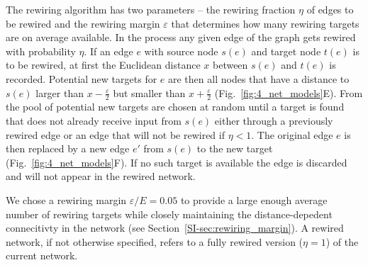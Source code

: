 The rewiring algorithm has two parameters -- the rewiring fraction
$\eta$ of edges to be rewired and the rewiring margin $\varepsilon$
that determines how many rewiring targets are on average available. In
the process any given edge of the graph gets rewired with probability
$\eta$. If an edge $e$ with source node $s(e)$ and target node $t(e)$
is to be rewired, at first the Euclidean distance $x$ between $s(e)$
and $t(e)$ is recorded. Potential new targets for $e$ are then all
nodes that have a distance to $s(e)$ larger than
$x-\frac{\varepsilon}{2}$ but smaller than $x+\frac{\varepsilon}{2}$
(Fig.~\ref{fig:4_net_models}E). From the pool of potential new targets
are chosen at random until a target is found that does not already
receive input from $s(e)$ either through a previously rewired edge or
an edge that will not be rewired if $\eta <1$. The original edge $e$
is then replaced by a new edge $e'$ from $s(e)$ to the new target
(Fig.~\ref{fig:4_net_models}F). If no such target is available the
edge is discarded and will not appear in the rewired network.

We chose a rewiring margin $\varepsilon / E = 0.05$ to provide a large
enough average number of rewiring targets while closely maintaining
the distance-depedent connecitivty in the network (see
Section~\ref{SI-sec:rewiring_margin}). A rewired network, if not
otherwise specified, refers to a fully rewired version ($\eta=1$) of
the current network. 












